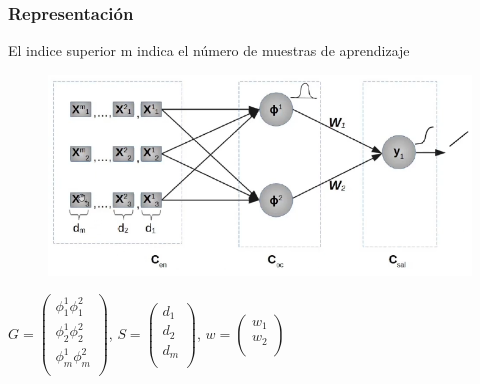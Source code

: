 \documentclass[
	11pt, %
]{beamer}
\begin{document}
\begin{frame}
  \frametitle{Representación}
  El indice superior m indica el número de muestras de aprendizaje
  \begin{figure}
    \includegraphics[width=0.7\linewidth]{rbradial.png}
  \end{figure}
  $G= \begin{pmatrix}
    \phi_{1}^{1} \phi_{1}^{2}\\
    \phi_{2}^{1} \phi_{2}^{2}\\
    \phi_{m}^{1} \phi_{m}^{2}\\
  \end{pmatrix}  $,
  $S= \begin{pmatrix}
    d_{1}\\
    d_{2}\\
    d_{m}\\
  \end{pmatrix}$,
  $w=\begin{pmatrix}
  w_{1}\\
  w_{2}\\
  \end{pmatrix}$
\end{frame}
\end{document}
